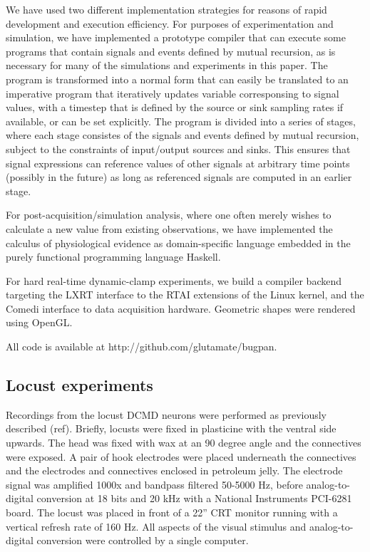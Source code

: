 We have used two different implementation strategies for reasons of
rapid development and execution efficiency. For purposes of
experimentation and simulation, we have implemented a prototype
compiler that can execute some programs that contain signals and
events defined by mutual recursion, as is necessary for many of the
simulations and experiments in this paper. The program is transformed
into a normal form that can easily be translated to an imperative
program that iteratively updates variable corresponsing to signal
values, with a timestep that is defined by the source or sink sampling
rates if available, or can be set explicitly. The program is divided
into a series of stages, where each stage consistes of the signals and
events defined by mutual recursion, subject to the constraints of
input/output sources and sinks. This ensures that signal expressions
can reference values of other signals at arbitrary time points
(possibly in the future) as long as referenced signals are computed in
an earlier stage.

For post-acquisition/simulation analysis, where one often merely
wishes to calculate a new value from existing observations, we have
implemented the calculus of physiological evidence as domain-specific
language embedded in the purely functional programming language
Haskell.

For hard real-time dynamic-clamp experiments, we build a compiler
backend targeting the LXRT interface to the RTAI extensions of the
Linux kernel, and the Comedi interface to data acquisition
hardware. Geometric shapes were rendered using OpenGL.

All code is available at http://github.com/glutamate/bugpan.

\subsection*{Locust experiments}

Recordings from the locust DCMD neurons were performed as previously
described (ref). Briefly, locusts were fixed in plasticine with the
ventral side upwards. The head was fixed with wax at an 90 degree
angle and the connectives were exposed. A pair of hook electrodes were
placed underneath the connectives and the electrodes and connectives
enclosed in petroleum jelly. The electrode signal was amplified 1000x
and bandpass filtered 50-5000 Hz, before analog-to-digital conversion
at 18 bits and 20 kHz with a National Instruments PCI-6281 board. The
locust was placed in front of a 22'' CRT monitor running with a
vertical refresh rate of 160 Hz. All aspects of the visual stimulus
and analog-to-digital conversion were controlled by a single computer.

